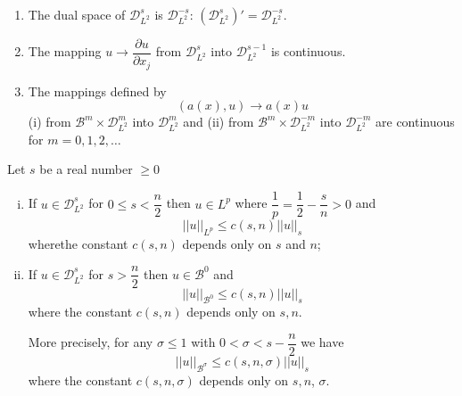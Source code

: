 \begin{remarks*}
\begin{enumerate}[(1)]
\item The dual space of $\mathscr{D}^s_{L^2}$ is
  $\mathscr{D}^{-s}_{L^2}$: $(\mathscr{D}^s_{L^2})' =
  \mathscr{D}^{-s}_{L^2}$.    

\item The mapping $u \to \dfrac{\partial u}{\partial x_j}$ from
  $\mathscr{D}^s_{L^2}$ into $\mathscr{D}^{s-1}_{L^2}$ is continuous.  

\item The mappings defined by 
$$
(a(x), u) \to a(x) u 
$$
(i) from $\mathscr{B}^m \times \mathscr{D}^m_{L^2}$ into
  $\mathscr{D}^m_{L^2}$ and (ii) from $\mathscr{B}^m \times
  \mathscr{D}^{-m}_{L^2}$ into $\mathscr{D}^{-m}_{L^2}$ are
  continuous for $m = 0, 1, 2, \ldots$ 
\end{enumerate}
\end{remarks*} 

\setcounter{lemma}{0} 
\begin{lemma}\label{chap5-sec1-lem1}  %
Let $s$ be a real number $\geq 0$  
\begin{enumerate}[(i)]
\item If $u \in \mathscr{D}^s_{L^2}$ for $0 \leq s <
  \dfrac{n}{2}$ then $u \in L^p$ where $\dfrac{1}{p} =
  \dfrac{1}{2} - \dfrac{s}{n} > 0 $ and  
\begin{equation*}
|| u ||_{L^p} \leq c (s, n) || u ||_s  \tag{1.6}\label{chap5-eq1.6}
\end{equation*}
where\pageoriginale the constant $c(s, n)$ depends only on $s$ and $n$; 

\item If $u \in\mathscr{D}^s_{L^2}$ for $s > \dfrac{n}{2}$ 
  then $u \in \mathscr{B}^0$ and  
\begin{equation*}
|| u ||_{\mathscr{B}^0} \leq c (s, n) || u ||_s \tag{1.7}\label{chap5-eq1.7}
\end{equation*}
where the constant $c(s, n)$ depends only on $s, n$. 

More precisely, for any $\sigma \leq 1$ with $ 0 < \sigma < s -
\dfrac{n}{2}$ we have  
 \begin{equation*}
|| u ||_{ \mathscr{B}^\sigma} \leq c (s, n, \sigma ) || u ||_s
\tag{1.8}\label{chap5-eq1.8}  
 \end{equation*} 
 where the constant $c(s, n, \sigma)$  depends only on $s, n$,
 $\sigma$. 
\end{enumerate}
\end{lemma}

